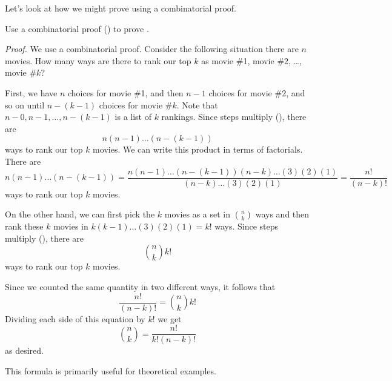 Let's look at how we might prove  using a combinatorial proof.

\begin{exam}
\label{exam_proof_explicit_binom}
    Use a combinatorial proof () to prove .
        \begin{soln}
            \emph{Proof.}  We use a combinatorial proof. Consider the following situation there are $n$ movies.  How many ways are there to rank our top $k$ as movie \#1, movie \#2, \ldots, movie \#$k$? 
        
            First, we have $n$ choices for movie \#1, and then $n-1$ choices for movie \#2, and so on until $n-(k-1)$ choices for movie \#$k$.  Note that $n-0, n-1, \ldots, n-(k-1)$ is a list of $k$ rankings.   Since steps multiply (), there are $$n(n-1)\ldots(n-(k-1))$$ ways to rank our top $k$ movies.  We can write this product in terms of factorials.  There are 
                $$n(n-1)\ldots(n-(k-1))
                = \frac{n(n-1)\ldots(n-(k-1))(n-k)\ldots(3)(2)(1)}
                {(n-k)\ldots(3)(2)(1)} 
                = \frac{n!}{(n-k)!}$$
            ways to rank our top $k$ movies.
        
            On the other hand, we can first pick the $k$ movies as a set in $\binom{n}{k}$ ways and then rank these $k$ movies in $k(k-1)\ldots(3)(2)(1) = k!$ ways.  Since steps multiply (), there are 
                $$\binom{n}{k}k!$$ 
            ways to rank our top $k$ movies.
        
            Since we counted the same quantity in two different ways, it follows that 
                $$\frac{n!}{(n-k)!}=\binom{n}{k}k!$$
            Dividing each side of this equation by $k!$ we get
                $$\binom{n}{k} = \frac{n!}{k!(n-k)!}$$
            as desired.
        \end{soln}
\end{exam}

This formula is primarily useful for theoretical examples.

